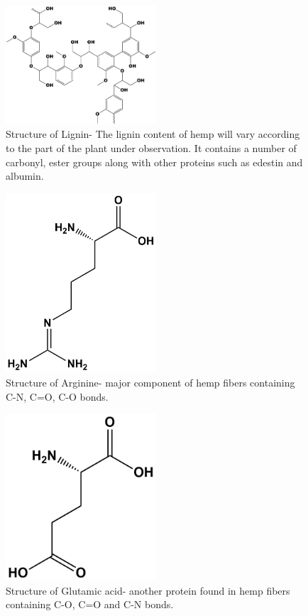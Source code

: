 \begin{figure}[tbh!]
  \centering
  \includegraphics[width=0.5\textwidth]{Figures/chap5fig/lignin}
    \caption{Structure of Lignin- The lignin content of hemp will vary according to the part of the plant under observation. It contains a number of carbonyl, ester groups along with other proteins such as edestin and albumin.}
  \label{Figures/chap5fig:lignin}
\end{figure}

\begin{figure}[tbh!]
  \centering
  \includegraphics[width=0.5\textwidth]{Figures/chap5fig/arginine}    
  \caption{Structure of Arginine- major component of hemp fibers containing C-N, C=O, C-O bonds.}
  \label{Figures/chap5fig:arginine}
\end{figure}

\begin{figure}[tbh!]
  \centering
  \includegraphics[width=0.5\textwidth]{Figures/chap5fig/gluacid}
    \caption{Structure of Glutamic acid- another protein found in hemp fibers containing C-O, C=O and C-N bonds.}
  \label{Figures/chap5fig:gluacid}
\end{figure}

